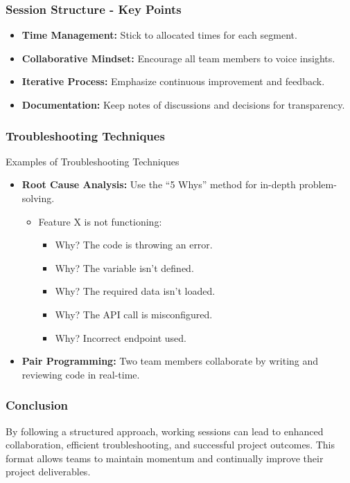\documentclass[aspectratio=169]{beamer}
\begin{document}
\begin{frame}[fragile]
    \frametitle{Session Structure - Key Points}
    \begin{itemize}
        \item \textbf{Time Management:} Stick to allocated times for each segment.
        \item \textbf{Collaborative Mindset:} Encourage all team members to voice insights.
        \item \textbf{Iterative Process:} Emphasize continuous improvement and feedback.
        \item \textbf{Documentation:} Keep notes of discussions and decisions for transparency.
    \end{itemize}
\end{frame}

\begin{frame}[fragile]
    \frametitle{Troubleshooting Techniques}
    \begin{block}{Examples of Troubleshooting Techniques}
        \begin{itemize}
            \item \textbf{Root Cause Analysis:} 
            Use the “5 Whys” method for in-depth problem-solving.
            \begin{itemize}
                \item Feature X is not functioning:
                \begin{itemize}
                    \item Why? The code is throwing an error.
                    \item Why? The variable isn't defined.
                    \item Why? The required data isn't loaded.
                    \item Why? The API call is misconfigured.
                    \item Why? Incorrect endpoint used.
                \end{itemize}
            \end{itemize}
            \item \textbf{Pair Programming:} 
            Two team members collaborate by writing and reviewing code in real-time.
        \end{itemize}
    \end{block}
\end{frame}

\begin{frame}[fragile]
    \frametitle{Conclusion}
    By following a structured approach, working sessions can lead to enhanced collaboration, efficient troubleshooting, and successful project outcomes. This format allows teams to maintain momentum and continually improve their project deliverables.
\end{frame}
\end{document}
